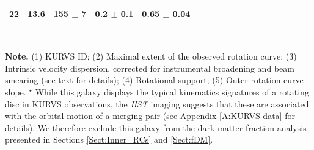 \begin{table}
\begin{tabular}{cccccc}
22 & 13.6 & 155 $\pm$ 7 & 0.2 $\pm$ 0.1 & 0.65 $\pm$ 0.04 & \\
\hline
\hline
\end{tabular}
\\[2mm] 
\begin{flushleft}
{\bf Note.} 
(1) KURVS ID;
(2) Maximal extent of the observed rotation curve;
(3) Intrinsic velocity dispersion, corrected for instrumental broadening and beam smearing (see text for details);
(4) Rotational support;
(5) Outer rotation curve slope.
$^{\star}$ {While this galaxy displays the typical kinematics signatures of a rotating disc in KURVS observations, the {\it HST} imaging suggests that these are associated with the orbital motion of a merging pair (see Appendix \ref{A:KURVS data} for details). 
We therefore exclude this galaxy from the dark matter fraction analysis presented in Sections \ref{Sect:Inner_RCs} and \ref{Sect:fDM}.}
 
\end{flushleft}
\end{table}
